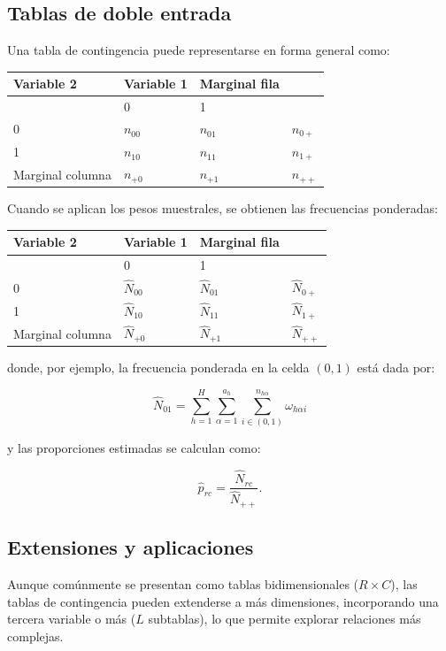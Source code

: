 \documentclass[
  12pt,
]{book}
\begin{document}
\subsection{Tablas de doble entrada}\label{tablas-de-doble-entrada}

Una tabla de contingencia puede representarse en forma general como:

\begin{longtable}[]{@{}llll@{}}
\toprule\noalign{}
Variable 2 & Variable 1 & Marginal fila & \\
\midrule\noalign{}
\endhead
\bottomrule\noalign{}
\endlastfoot
& 0 & 1 & \\
0 & \(n_{00}\) & \(n_{01}\) & \(n_{0+}\) \\
1 & \(n_{10}\) & \(n_{11}\) & \(n_{1+}\) \\
Marginal columna & \(n_{+0}\) & \(n_{+1}\) & \(n_{++}\) \\
\end{longtable}

Cuando se aplican los pesos muestrales, se obtienen las frecuencias ponderadas:

\begin{longtable}[]{@{}llll@{}}
\toprule\noalign{}
Variable 2 & Variable 1 & Marginal fila & \\
\midrule\noalign{}
\endhead
\bottomrule\noalign{}
\endlastfoot
& 0 & 1 & \\
0 & \(\hat{N}_{00}\) & \(\hat{N}_{01}\) & \(\hat{N}_{0+}\) \\
1 & \(\hat{N}_{10}\) & \(\hat{N}_{11}\) & \(\hat{N}_{1+}\) \\
Marginal columna & \(\hat{N}_{+0}\) & \(\hat{N}_{+1}\) & \(\hat{N}_{++}\) \\
\end{longtable}

donde, por ejemplo, la frecuencia ponderada en la celda \((0,1)\) está dada por:

\[
\hat{N}_{01} = \sum_{h=1}^{H} \sum_{\alpha=1}^{a_{h}} \sum_{i \in (0,1)}^{n_{h\alpha}} \omega_{h\alpha i}
\]

y las proporciones estimadas se calculan como:

\[
\hat{p}_{rc}=\frac{\hat{N}_{rc}}{\hat{N}_{++}}.
\]

\subsection{Extensiones y aplicaciones}\label{extensiones-y-aplicaciones}

Aunque comúnmente se presentan como tablas bidimensionales (\(R \times C\)), las tablas de contingencia pueden extenderse a más dimensiones, incorporando una tercera variable o más (\(L\) subtablas), lo que permite explorar relaciones más complejas.
\end{document}
